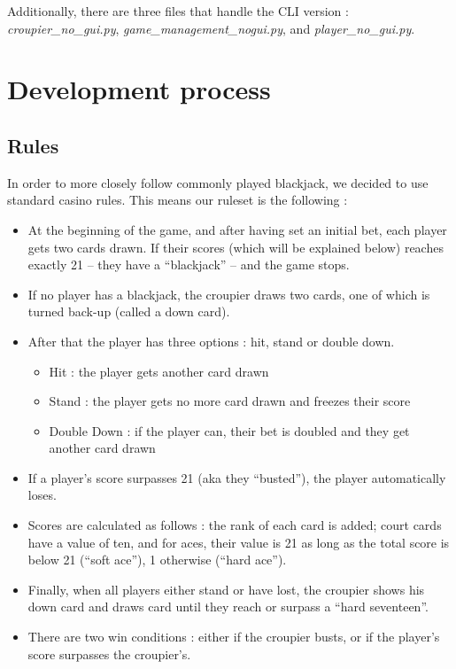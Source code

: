 \documentclass[a4paper, twoside]{report}
\begin{document}
        Additionally, there are three files that handle the CLI version : \textit{croupier\_no\_gui.py}, \textit{game\_management\_nogui.py}, and \textit{player\_no\_gui.py}.



\chapter{Development process}

    \section{Rules}

        In order to more closely follow commonly played blackjack, we decided to use standard casino rules. This means our ruleset is the following :
        \begin{itemize}
            \item At the beginning of the game, and after having set an initial bet, each player gets two cards drawn. If their scores (which will be explained below) reaches exactly 21 -- they have a ``blackjack'' -- and the game stops.
            \item If no player has a blackjack, the croupier draws two cards, one of which is turned back-up (called a down card).
            \item After that the player has three options : hit, stand or double down. 
            \begin{itemize}
                \item Hit : the player gets another card drawn
                \item Stand : the player gets no more card drawn and freezes their score
                \item Double Down : if the player can, their bet is doubled and they get another card drawn
            \end{itemize}
            \item If a player's score surpasses 21 (aka they ``busted''), the player automatically loses.
            \item Scores are calculated as follows : the rank of each card is added; court cards have a value of ten, and for aces, their value is 21 as long as the total score is below 21 (``soft ace''), 1 otherwise (``hard ace'').
            \item Finally, when all players either stand or have lost, the croupier shows his down card and draws card until they reach or surpass a ``hard seventeen''.
            \item There are two win conditions : either if the croupier busts, or if the player's score surpasses the croupier's.
        \end{itemize}
\end{document}
